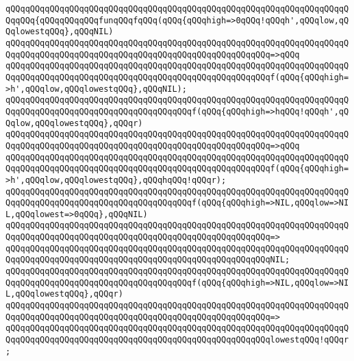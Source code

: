 \verb|qQQqqQQqqQQqqQQqqQQqqQQqqQQqqQQqqQQqqQQqqQQqqQQqqQQqqQQqqQQqqQQqqQQqqQQqqQQq{qQQqqQQqqQQqfunqQQqfqQQq(qQQq{qQQqhigh=>0qQQq!qQQqh',qQQqlow,qQQqlowestqQQq},qQQqNIL)|\newline
\verb|qQQqqQQqqQQqqQQqqQQqqQQqqQQqqQQqqQQqqQQqqQQqqQQqqQQqqQQqqQQqqQQqqQQqqQQqqQQqqQQqqQQqqQQqqQQqqQQqqQQqqQQqqQQqqQQqqQQqqQQqqQQq=>qQQq|\newline
\verb|qQQqqQQqqQQqqQQqqQQqqQQqqQQqqQQqqQQqqQQqqQQqqQQqqQQqqQQqqQQqqQQqqQQqqQQqqQQqqQQqqQQqqQQqqQQqqQQqqQQqqQQqqQQqqQQqqQQqqQQqqQQqf(qQQq{qQQqhigh=>h',qQQqlow,qQQqlowestqQQq},qQQqNIL);|\newline
\newline
\verb|qQQqqQQqqQQqqQQqqQQqqQQqqQQqqQQqqQQqqQQqqQQqqQQqqQQqqQQqqQQqqQQqqQQqqQQqqQQqqQQqqQQqqQQqqQQqqQQqqQQqqQQqqQQqf(qQQq{qQQqhigh=>hqQQq!qQQqh',qQQqlow,qQQqlowestqQQq},qQQqr)|\newline
\verb|qQQqqQQqqQQqqQQqqQQqqQQqqQQqqQQqqQQqqQQqqQQqqQQqqQQqqQQqqQQqqQQqqQQqqQQqqQQqqQQqqQQqqQQqqQQqqQQqqQQqqQQqqQQqqQQqqQQqqQQqqQQq=>qQQq|\newline
\verb|qQQqqQQqqQQqqQQqqQQqqQQqqQQqqQQqqQQqqQQqqQQqqQQqqQQqqQQqqQQqqQQqqQQqqQQqqQQqqQQqqQQqqQQqqQQqqQQqqQQqqQQqqQQqqQQqqQQqqQQqqQQqf(qQQq{qQQqhigh=>h',qQQqlow,qQQqlowestqQQq},qQQqhqQQq!qQQqr);|\newline
\newline
\verb|qQQqqQQqqQQqqQQqqQQqqQQqqQQqqQQqqQQqqQQqqQQqqQQqqQQqqQQqqQQqqQQqqQQqqQQqqQQqqQQqqQQqqQQqqQQqqQQqqQQqqQQqqQQqf(qQQq{qQQqhigh=>NIL,qQQqlow=>NIL,qQQqlowest=>0qQQq},qQQqNIL)|\newline
\verb|qQQqqQQqqQQqqQQqqQQqqQQqqQQqqQQqqQQqqQQqqQQqqQQqqQQqqQQqqQQqqQQqqQQqqQQqqQQqqQQqqQQqqQQqqQQqqQQqqQQqqQQqqQQqqQQqqQQqqQQqqQQq=>|\newline
\verb|qQQqqQQqqQQqqQQqqQQqqQQqqQQqqQQqqQQqqQQqqQQqqQQqqQQqqQQqqQQqqQQqqQQqqQQqqQQqqQQqqQQqqQQqqQQqqQQqqQQqqQQqqQQqqQQqqQQqqQQqqQQqNIL;|\newline
\newline
\verb|qQQqqQQqqQQqqQQqqQQqqQQqqQQqqQQqqQQqqQQqqQQqqQQqqQQqqQQqqQQqqQQqqQQqqQQqqQQqqQQqqQQqqQQqqQQqqQQqqQQqqQQqqQQqf(qQQq{qQQqhigh=>NIL,qQQqlow=>NIL,qQQqlowestqQQq},qQQqr)|\newline
\verb|qQQqqQQqqQQqqQQqqQQqqQQqqQQqqQQqqQQqqQQqqQQqqQQqqQQqqQQqqQQqqQQqqQQqqQQqqQQqqQQqqQQqqQQqqQQqqQQqqQQqqQQqqQQqqQQqqQQqqQQqqQQq=>|\newline
\verb|qQQqqQQqqQQqqQQqqQQqqQQqqQQqqQQqqQQqqQQqqQQqqQQqqQQqqQQqqQQqqQQqqQQqqQQqqQQqqQQqqQQqqQQqqQQqqQQqqQQqqQQqqQQqqQQqqQQqqQQqqQQqlowestqQQq!qQQqr;|\newline

